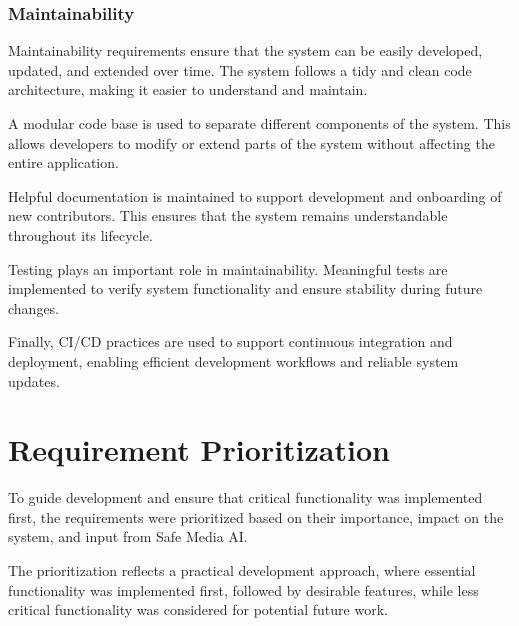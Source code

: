 \subsubsection{Maintainability}

Maintainability requirements ensure that the system can be easily developed, updated, and extended over time. The system follows a tidy and clean code architecture, making it easier to understand and maintain.

A modular code base is used to separate different components of the system. This allows developers to modify or extend parts of the system without affecting the entire application.

Helpful documentation is maintained to support development and onboarding of new contributors. This ensures that the system remains understandable throughout its lifecycle.

Testing plays an important role in maintainability. Meaningful tests are implemented to verify system functionality and ensure stability during future changes.

Finally, CI/CD practices are used to support continuous integration and deployment, enabling efficient development workflows and reliable system updates.


\section{Requirement Prioritization}

To guide development and ensure that critical functionality was implemented first, the requirements were prioritized based on their importance, impact on the system, and input from Safe Media AI.

The prioritization reflects a practical development approach, where essential functionality was implemented first, followed by desirable features, while less critical functionality was considered for potential future work.

